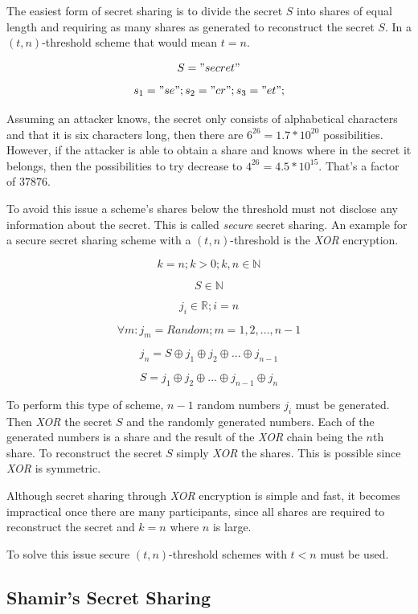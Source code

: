 The easiest form of secret sharing is to divide the secret $S$ into shares of
equal length and requiring as many shares as generated to reconstruct the
secret $S$. In a $(t, n)$-threshold scheme that would mean $t = n$.

$$S = "secret"$$
$$s_1 = "se"; s_2 = "cr"; s_3 = "et";$$

Assuming an attacker knows, the secret only consists of alphabetical characters
and that it is six characters long, then there are $6^{26} = 1.7 * 10^{20}$
possibilities.  However, if the attacker is able to obtain a share and knows
where in the secret it belongs, then the possibilities to try decrease to
$4^{26} = 4.5 * 10^{15}$. That's a factor of $37876$.

To avoid this issue a scheme's shares below the threshold must not disclose any
information about the secret. This is called \textit{secure} secret sharing.
An example for a secure secret sharing scheme with a $(t, n)$-threshold is the
\textit{XOR} encryption.

$$k = n; k > 0;k, n \in \mathbb{N}$$

$$S \in \mathbb{N}$$

$$j_{i} \in \mathbb{R}; i = n$$

$$\forall m: j_{m} = Random; m = {1, 2, ..., n-1}$$

$$j_{n} = S \oplus j_{1} \oplus j_{2} \oplus ... \oplus j_{n-1} $$

$$S = j_{1} \oplus j_{2} \oplus ... \oplus j_{n-1} \oplus j_{n} $$

To perform this type of scheme, $n-1$ random numbers $j_{i}$ must be generated.
Then \textit{XOR} the secret $S$ and the randomly generated numbers. Each of
the generated numbers is a share and the result of the \textit{XOR} chain being
the $n$th share. To reconstruct the secret $S$ simply \textit{XOR} the shares.
This is possible since \textit{XOR} is symmetric.

Although secret sharing through \textit{XOR} encryption is simple and fast, it
becomes impractical once there are many participants, since all shares are
required to reconstruct the secret and $k = n$ where $n$ is large.

To solve this issue secure $(t, n)$-threshold schemes with $t < n$ must be
used.

\subsection{Shamir's Secret Sharing}

